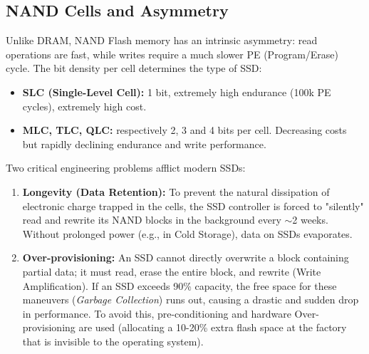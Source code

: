 \subsection{NAND Cells and Asymmetry}
Unlike DRAM, NAND Flash memory has an intrinsic asymmetry: read operations are fast, while writes require a much slower PE (Program/Erase) cycle. The bit density per cell determines the type of SSD:
\begin{itemize}
    \item \textbf{SLC (Single-Level Cell):} 1 bit, extremely high endurance (100k PE cycles), extremely high cost.
    \item \textbf{MLC, TLC, QLC:} respectively 2, 3 and 4 bits per cell. Decreasing costs but rapidly declining endurance and write performance.
\end{itemize}

\begin{warningbox}
Two critical engineering problems afflict modern SSDs:
\begin{enumerate}
    \item \textbf{Longevity (Data Retention):} To prevent the natural dissipation of electronic charge trapped in the cells, the SSD controller is forced to "silently" read and rewrite its NAND blocks in the background every $\sim$2 weeks. Without prolonged power (e.g., in Cold Storage), data on SSDs evaporates.
    \item \textbf{Over-provisioning:} An SSD cannot directly overwrite a block containing partial data; it must read, erase the entire block, and rewrite (Write Amplification). If an SSD exceeds 90\% capacity, the free space for these maneuvers (\textit{Garbage Collection}) runs out, causing a drastic and sudden drop in performance. To avoid this, pre-conditioning and hardware Over-provisioning are used (allocating a 10-20\% extra flash space at the factory that is invisible to the operating system).
\end{enumerate}
\end{warningbox}

